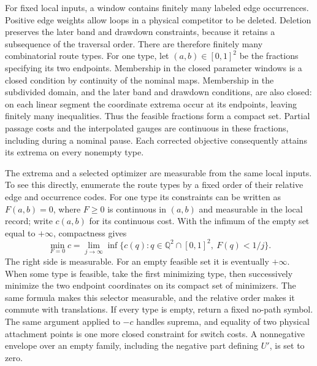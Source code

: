 For fixed local inputs, a window contains finitely many labeled edge
occurrences. Positive edge weights allow loops in a physical competitor
to be deleted. Deletion preserves the later band and drawdown constraints,
because it retains a subsequence of the traversal order. There are
therefore finitely many combinatorial route types. For one type, let
$(a,b)\in[0,1]^2$ be the fractions specifying its two endpoints.
Membership in the closed parameter windows is a closed condition by
continuity of the nominal maps. Membership in the subdivided domain,
and the later band and drawdown conditions, are also closed: on each
linear segment the coordinate extrema occur at its endpoints, leaving
finitely many inequalities. Thus the feasible fractions form a compact
set. Partial passage costs and the interpolated gauges are continuous
in these fractions, including during a nominal pause. Each corrected
objective consequently attains its extrema on every nonempty type.

The extrema and a selected optimizer are measurable from the same local
inputs. To see this directly, enumerate the route types by a fixed order
of their relative edge and occurrence codes. For one type its constraints
can be written as $F(a,b)=0$, where $F\ge0$ is continuous in $(a,b)$
and measurable in the local record; write $c(a,b)$ for its continuous
cost. With the infimum of the empty set equal to $+\infty$, compactness
gives
\[
 \min_{F=0}c
 =\lim_{j\to\infty}\inf\{c(q):q\in\mathbb Q^2\cap[0,1]^2,
                                      \ F(q)<1/j\}.
\]
The right side is measurable. For an empty feasible set it is eventually
$+\infty$. When some type is feasible, take the first minimizing type,
then successively minimize the two endpoint coordinates on its compact
set of minimizers. The same formula makes this selector measurable, and
the relative order makes it commute with translations. If every type is
empty, return a fixed no-path symbol. The same argument applied to $-c$
handles suprema, and equality of two physical attachment points is one
more closed constraint for switch costs. A nonnegative envelope over an
empty family, including the negative part defining $U'$, is set to zero.

